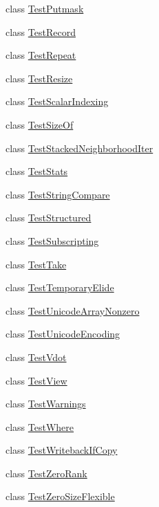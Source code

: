 \begin{DoxyCompactItemize}
\item 
class \hyperlink{classnumpy_1_1core_1_1tests_1_1test__multiarray_1_1TestPutmask}{Test\+Putmask}
\item 
class \hyperlink{classnumpy_1_1core_1_1tests_1_1test__multiarray_1_1TestRecord}{Test\+Record}
\item 
class \hyperlink{classnumpy_1_1core_1_1tests_1_1test__multiarray_1_1TestRepeat}{Test\+Repeat}
\item 
class \hyperlink{classnumpy_1_1core_1_1tests_1_1test__multiarray_1_1TestResize}{Test\+Resize}
\item 
class \hyperlink{classnumpy_1_1core_1_1tests_1_1test__multiarray_1_1TestScalarIndexing}{Test\+Scalar\+Indexing}
\item 
class \hyperlink{classnumpy_1_1core_1_1tests_1_1test__multiarray_1_1TestSizeOf}{Test\+Size\+Of}
\item 
class \hyperlink{classnumpy_1_1core_1_1tests_1_1test__multiarray_1_1TestStackedNeighborhoodIter}{Test\+Stacked\+Neighborhood\+Iter}
\item 
class \hyperlink{classnumpy_1_1core_1_1tests_1_1test__multiarray_1_1TestStats}{Test\+Stats}
\item 
class \hyperlink{classnumpy_1_1core_1_1tests_1_1test__multiarray_1_1TestStringCompare}{Test\+String\+Compare}
\item 
class \hyperlink{classnumpy_1_1core_1_1tests_1_1test__multiarray_1_1TestStructured}{Test\+Structured}
\item 
class \hyperlink{classnumpy_1_1core_1_1tests_1_1test__multiarray_1_1TestSubscripting}{Test\+Subscripting}
\item 
class \hyperlink{classnumpy_1_1core_1_1tests_1_1test__multiarray_1_1TestTake}{Test\+Take}
\item 
class \hyperlink{classnumpy_1_1core_1_1tests_1_1test__multiarray_1_1TestTemporaryElide}{Test\+Temporary\+Elide}
\item 
class \hyperlink{classnumpy_1_1core_1_1tests_1_1test__multiarray_1_1TestUnicodeArrayNonzero}{Test\+Unicode\+Array\+Nonzero}
\item 
class \hyperlink{classnumpy_1_1core_1_1tests_1_1test__multiarray_1_1TestUnicodeEncoding}{Test\+Unicode\+Encoding}
\item 
class \hyperlink{classnumpy_1_1core_1_1tests_1_1test__multiarray_1_1TestVdot}{Test\+Vdot}
\item 
class \hyperlink{classnumpy_1_1core_1_1tests_1_1test__multiarray_1_1TestView}{Test\+View}
\item 
class \hyperlink{classnumpy_1_1core_1_1tests_1_1test__multiarray_1_1TestWarnings}{Test\+Warnings}
\item 
class \hyperlink{classnumpy_1_1core_1_1tests_1_1test__multiarray_1_1TestWhere}{Test\+Where}
\item 
class \hyperlink{classnumpy_1_1core_1_1tests_1_1test__multiarray_1_1TestWritebackIfCopy}{Test\+Writeback\+If\+Copy}
\item 
class \hyperlink{classnumpy_1_1core_1_1tests_1_1test__multiarray_1_1TestZeroRank}{Test\+Zero\+Rank}
\item 
class \hyperlink{classnumpy_1_1core_1_1tests_1_1test__multiarray_1_1TestZeroSizeFlexible}{Test\+Zero\+Size\+Flexible}
\end{DoxyCompactItemize}
